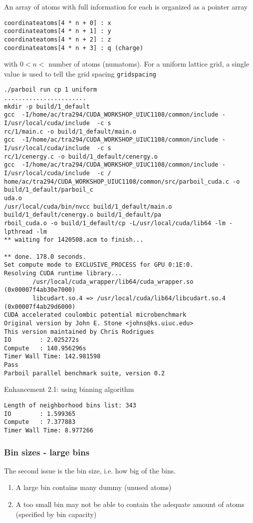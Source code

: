 An array of atoms with full information for each is organized as a
pointer array
\begin{lstlisting}
coordinateatoms[4 * n + 0] : x
coordinateatoms[4 * n + 1] : y
coordinateatoms[4 * n + 2] : z
coordinateatoms[4 * n + 3] : q (charge)
\end{lstlisting}
with $0 < n <$ number of atoms (numatoms). For a uniform lattice grid,
a single value is used to tell the grid spacing \verb!gridspacing!
\begin{verbatim}
./parboil run cp 1 uniform
.......................
mkdir -p build/1_default
gcc  -I/home/ac/tra294/CUDA_WORKSHOP_UIUC1108/common/include -I/usr/local/cuda/include  -c s
rc/1/main.c -o build/1_default/main.o
gcc  -I/home/ac/tra294/CUDA_WORKSHOP_UIUC1108/common/include -I/usr/local/cuda/include  -c s
rc/1/cenergy.c -o build/1_default/cenergy.o
gcc  -I/home/ac/tra294/CUDA_WORKSHOP_UIUC1108/common/include -I/usr/local/cuda/include  -c /
home/ac/tra294/CUDA_WORKSHOP_UIUC1108/common/src/parboil_cuda.c -o build/1_default/parboil_c
uda.o
/usr/local/cuda/bin/nvcc build/1_default/main.o build/1_default/cenergy.o build/1_default/pa
rboil_cuda.o -o build/1_default/cp -L/usr/local/cuda/lib64 -lm -lpthread -lm
** waiting for 1420508.acm to finish...

** done. 178.0 seconds.
Set compute mode to EXCLUSIVE_PROCESS for GPU 0:1E:0.
Resolving CUDA runtime library...
        /usr/local/cuda_wrapper/lib64/cuda_wrapper.so (0x00007f4ab30e7000)
        libcudart.so.4 => /usr/local/cuda/lib64/libcudart.so.4 (0x00007f4ab29d6000)
CUDA accelerated coulombic potential microbenchmark
Original version by John E. Stone <johns@ks.uiuc.edu>
This version maintained by Chris Rodrigues
IO        : 2.025272s
Compute   : 140.956296s
Timer Wall Time: 142.981598
Pass
Parboil parallel benchmark suite, version 0.2
\end{verbatim}

Enhancement 2.1: using binning algorithm
\begin{verbatim}
Length of neighborhood bins list: 343
IO        : 1.599365
Compute   : 7.377883
Timer Wall Time: 8.977266
\end{verbatim}




\subsubsection{Bin sizes - large bins}
\label{sec:bin-sizes}

The second issue is the bin size, i.e. how big of the bins. 
\begin{enumerate}
\item A large bin contains many dummy (unused atoms)
\item A too small bin may not be able to contain the adequate amount
  of atoms (specified by bin capacity)
\end{enumerate}


